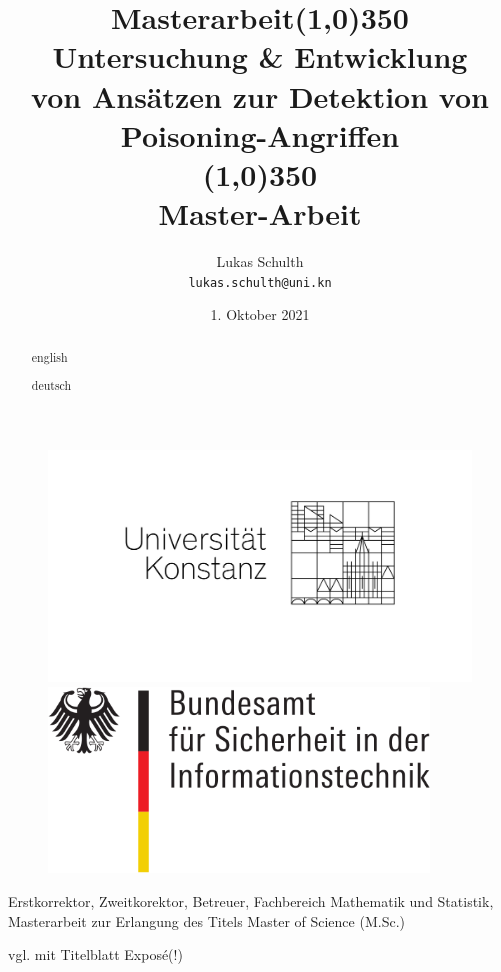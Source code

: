 \documentclass[twoside, 12pt,a4paper]{article}
\title{Masterarbeit}
\title{\line(1,0){350}\\Untersuchung \& Entwicklung \\von Ansätzen zur Detektion von Poisoning-Angriffen\\\line(1,0){350}\\
	Master-Arbeit}
\author{
	
	Lukas Schulth\\
	\texttt{lukas.schulth@uni.kn}
}
\date{1. Oktober 2021}
\numberwithin{equation}{section}
\begin{document}
	\begin{titlepage}
		
		
		
		\thispagestyle{empty} 
		\begin{figure}
			\centering
			\begin{minipage}{0.45\textwidth}
				\centering
				\includegraphics[width=1.2\textwidth]{logounikn} %
				
			\end{minipage}\hfill
			\begin{minipage}{0.45\textwidth}
				\centering
				\includegraphics[width=0.9\textwidth]{bsi_logo} %
			
			\end{minipage}
		\end{figure}
	\maketitle
	
	Erstkorrektor, Zweitkorektor, Betreuer, Fachbereich Mathematik und Statistik, Masterarbeit zur Erlangung des Titels Master of Science (M.Sc.)
	
	vgl. mit Titelblatt Exposé(!)
	
	\end{titlepage}
	\begin{abstract}english\end{abstract}
	\begin{abstract}deutsch\end{abstract}
\end{document}
